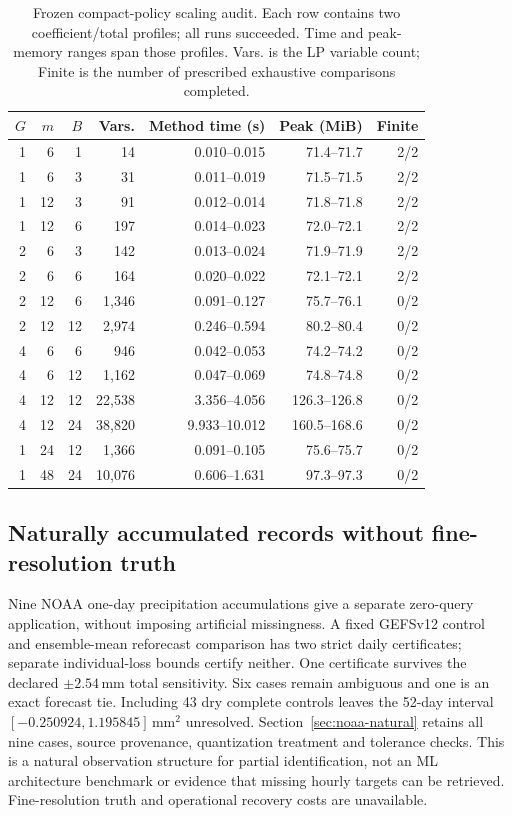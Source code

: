 \documentclass[12pt]{article}
\begin{document}
\begin{table}[htbp]
\centering\small
\caption{Frozen compact-policy scaling audit. Each row contains two coefficient/total profiles; all runs succeeded. Time and peak-memory ranges span those profiles. Vars. is the LP variable count; Finite is the number of prescribed exhaustive comparisons completed.}
\label{tab:compact-scaling-audit}
\begin{tabular}{rrrrrrr}
\hline
$G$ & $m$ & $B$ & Vars. & Method time (s) & Peak (MiB) & Finite \\
\hline
1 & 6 & 1 & 14 & 0.010--0.015 & 71.4--71.7 & 2/2 \\
1 & 6 & 3 & 31 & 0.011--0.019 & 71.5--71.5 & 2/2 \\
1 & 12 & 3 & 91 & 0.012--0.014 & 71.8--71.8 & 2/2 \\
1 & 12 & 6 & 197 & 0.014--0.023 & 72.0--72.1 & 2/2 \\
2 & 6 & 3 & 142 & 0.013--0.024 & 71.9--71.9 & 2/2 \\
2 & 6 & 6 & 164 & 0.020--0.022 & 72.1--72.1 & 2/2 \\
2 & 12 & 6 & 1,346 & 0.091--0.127 & 75.7--76.1 & 0/2 \\
2 & 12 & 12 & 2,974 & 0.246--0.594 & 80.2--80.4 & 0/2 \\
4 & 6 & 6 & 946 & 0.042--0.053 & 74.2--74.2 & 0/2 \\
4 & 6 & 12 & 1,162 & 0.047--0.069 & 74.8--74.8 & 0/2 \\
4 & 12 & 12 & 22,538 & 3.356--4.056 & 126.3--126.8 & 0/2 \\
4 & 12 & 24 & 38,820 & 9.933--10.012 & 160.5--168.6 & 0/2 \\
1 & 24 & 12 & 1,366 & 0.091--0.105 & 75.6--75.7 & 0/2 \\
1 & 48 & 24 & 10,076 & 0.606--1.631 & 97.3--97.3 & 0/2 \\
\hline
\end{tabular}
\end{table}
\FloatBarrier
\subsection{Naturally accumulated records without fine-resolution truth}
Nine NOAA one-day precipitation accumulations give a separate zero-query
application, without imposing artificial missingness. A fixed GEFSv12 control
and ensemble-mean reforecast comparison has two strict daily certificates;
separate individual-loss bounds certify neither. One certificate survives
the declared $\pm2.54$\,mm total sensitivity. Six cases remain ambiguous and
one is an exact forecast tie. Including 43 dry complete controls leaves the
52-day interval $[-0.250924,1.195845]\,\mathrm{mm}^2$ unresolved.
Section~\ref{sec:noaa-natural} retains all nine cases, source provenance,
quantization treatment and tolerance checks. This is a natural observation
structure for partial identification, not an ML architecture benchmark or
evidence that missing hourly targets can be retrieved. Fine-resolution truth
and operational recovery costs are unavailable.
\end{document}
